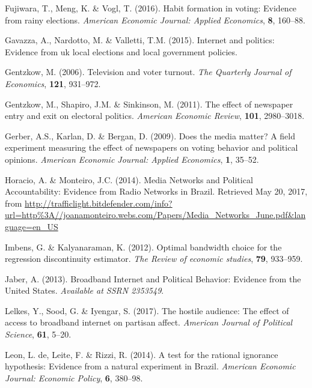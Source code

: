 \documentclass[12pt,]{article}
\begin{document}
\leavevmode\hypertarget{ref-fujiwara_habit_2016}{}%
Fujiwara, T., Meng, K. \& Vogl, T. (2016). Habit formation in voting:
Evidence from rainy elections. \emph{American Economic Journal: Applied
Economics}, \textbf{8}, 160--88.

\leavevmode\hypertarget{ref-gavazza_internet_2015}{}%
Gavazza, A., Nardotto, M. \& Valletti, T.M. (2015). Internet and
politics: Evidence from uk local elections and local government
policies.

\leavevmode\hypertarget{ref-gentzkow_television_2006}{}%
Gentzkow, M. (2006). Television and voter turnout. \emph{The Quarterly
Journal of Economics}, \textbf{121}, 931--972.

\leavevmode\hypertarget{ref-gentzkow_effect_2011}{}%
Gentzkow, M., Shapiro, J.M. \& Sinkinson, M. (2011). The effect of
newspaper entry and exit on electoral politics. \emph{American Economic
Review}, \textbf{101}, 2980--3018.

\leavevmode\hypertarget{ref-gerber_does_2009}{}%
Gerber, A.S., Karlan, D. \& Bergan, D. (2009). Does the media matter? A
field experiment measuring the effect of newspapers on voting behavior
and political opinions. \emph{American Economic Journal: Applied
Economics}, \textbf{1}, 35--52.

\leavevmode\hypertarget{ref-horacio_media_2014}{}%
Horacio, A. \& Monteiro, J.C. (2014). Media Networks and Political
Accountability: Evidence from Radio Networks in Brazil. Retrieved May
20, 2017, from
\url{http://trafficlight.bitdefender.com/info?url=http\%3A//joanamonteiro.webs.com/Papers/Media_Networks_June.pdf\&language=en_US}

\leavevmode\hypertarget{ref-imbens_optimal_2012}{}%
Imbens, G. \& Kalyanaraman, K. (2012). Optimal bandwidth choice for the
regression discontinuity estimator. \emph{The Review of economic
studies}, \textbf{79}, 933--959.

\leavevmode\hypertarget{ref-jaber_broadband_2013}{}%
Jaber, A. (2013). Broadband Internet and Political Behavior: Evidence
from the United States. \emph{Available at SSRN 2353549}.

\leavevmode\hypertarget{ref-lelkes_hostile_2017}{}%
Lelkes, Y., Sood, G. \& Iyengar, S. (2017). The hostile audience: The
effect of access to broadband internet on partisan affect.
\emph{American Journal of Political Science}, \textbf{61}, 5--20.

\leavevmode\hypertarget{ref-de_leon_test_2014}{}%
Leon, L. de, Leite, F. \& Rizzi, R. (2014). A test for the rational
ignorance hypothesis: Evidence from a natural experiment in Brazil.
\emph{American Economic Journal: Economic Policy}, \textbf{6}, 380--98.
\end{document}
